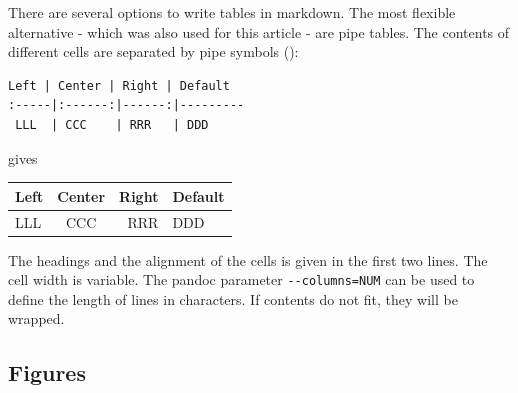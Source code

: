 \documentclass[10pt,fleqn]{wlpeerj}
\begin{document}
There
are
several
options
to
write
tables
in
markdown.
The
most
flexible
alternative
-
which
was
also
used
for
this
article
- are
pipe
tables.
The
contents
of
different
cells
are
separated
by
pipe
symbols
(\texttt{\textbar{}}):

\begin{verbatim}
Left | Center | Right | Default
:-----|:------:|------:|---------
 LLL  | CCC    | RRR   | DDD
\end{verbatim}

gives

\begin{longtable}[]{@{}lcrl@{}}
\toprule
\begin{minipage}[b]{0.17\columnwidth}\raggedright\strut
Left
\strut\end{minipage}
&
\begin{minipage}[b]{0.24\columnwidth}\centering\strut
Center
\strut\end{minipage}
&
\begin{minipage}[b]{0.20\columnwidth}\raggedleft\strut
Right
\strut\end{minipage}
&
\begin{minipage}[b]{0.27\columnwidth}\raggedright\strut
Default
\strut\end{minipage}\tabularnewline
\midrule
\endhead
\begin{minipage}[t]{0.17\columnwidth}\raggedright\strut
LLL
\strut\end{minipage}
&
\begin{minipage}[t]{0.24\columnwidth}\centering\strut
CCC
\strut\end{minipage}
&
\begin{minipage}[t]{0.20\columnwidth}\raggedleft\strut
RRR
\strut\end{minipage}
&
\begin{minipage}[t]{0.27\columnwidth}\raggedright\strut
DDD
\strut\end{minipage}\tabularnewline
\bottomrule
\end{longtable}

The
headings
and
the
alignment
of
the
cells
is
given
in
the
first
two
lines.
The
cell
width
is
variable.
The
pandoc
parameter
\texttt{-\/-columns=NUM}
can
be
used
to
define
the
length
of
lines
in
characters.
If
contents
do
not
fit,
they
will
be
wrapped.

\subsection{Figures}\label{figures}
\end{document}
